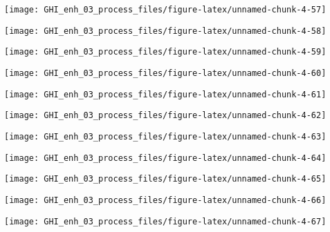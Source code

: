 \documentclass[
  10pt,
  a4paper,oneside]{article}
\begin{document}
\begin{center}\texttt{[image: GHI\_enh\_03\_process\_files/figure-latex/unnamed-chunk-4-57]} \end{center}

\begin{center}\texttt{[image: GHI\_enh\_03\_process\_files/figure-latex/unnamed-chunk-4-58]} \end{center}

\begin{center}\texttt{[image: GHI\_enh\_03\_process\_files/figure-latex/unnamed-chunk-4-59]} \end{center}

\begin{center}\texttt{[image: GHI\_enh\_03\_process\_files/figure-latex/unnamed-chunk-4-60]} \end{center}

\begin{center}\texttt{[image: GHI\_enh\_03\_process\_files/figure-latex/unnamed-chunk-4-61]} \end{center}

\begin{center}\texttt{[image: GHI\_enh\_03\_process\_files/figure-latex/unnamed-chunk-4-62]} \end{center}

\begin{center}\texttt{[image: GHI\_enh\_03\_process\_files/figure-latex/unnamed-chunk-4-63]} \end{center}

\begin{center}\texttt{[image: GHI\_enh\_03\_process\_files/figure-latex/unnamed-chunk-4-64]} \end{center}

\begin{center}\texttt{[image: GHI\_enh\_03\_process\_files/figure-latex/unnamed-chunk-4-65]} \end{center}

\begin{center}\texttt{[image: GHI\_enh\_03\_process\_files/figure-latex/unnamed-chunk-4-66]} \end{center}

\begin{center}\texttt{[image: GHI\_enh\_03\_process\_files/figure-latex/unnamed-chunk-4-67]} \end{center}
\end{document}
